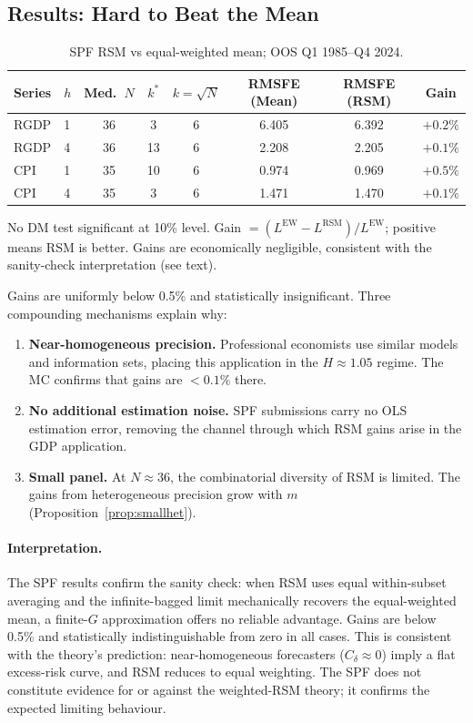 \documentclass[12pt,a4paper]{article}
\theoremstyle{definition}
\begin{document}
\subsection{Results: Hard to Beat the Mean}

\begin{table}[ht]
\centering
\caption{SPF RSM vs equal-weighted mean; OOS Q1 1985--Q4 2024.}
\label{tab:spf}
\begin{tabular}{llcccccc}
\toprule
Series & $h$ & Med.\ $N$ & $k^*$ & $k=\!\sqrt{N}$ & RMSFE (Mean) & RMSFE (RSM) & Gain \\
\midrule
RGDP & 1 & 36 & 3  & 6 & 6.405 & 6.392 & $+0.2\%$ \\
RGDP & 4 & 36 & 13 & 6 & 2.208 & 2.205 & $+0.1\%$ \\
CPI  & 1 & 35 & 10 & 6 & 0.974 & 0.969 & $+0.5\%$ \\
CPI  & 4 & 35 &  3 & 6 & 1.471 & 1.470 & $+0.1\%$ \\
\bottomrule
\end{tabular}
\footnotesize{No DM test significant at 10\% level. Gain $=(L^{\mathrm{EW}}-L^{\mathrm{RSM}})/L^{\mathrm{EW}}$;
positive means RSM is better. Gains are economically negligible, consistent with the
sanity-check interpretation (see text).}
\end{table}

Gains are uniformly below 0.5\% and statistically insignificant. Three
compounding mechanisms explain why:
\begin{enumerate}
\item \textbf{Near-homogeneous precision.} Professional economists use
  similar models and information sets, placing this application in the
  $H\approx1.05$ regime. The MC confirms that gains are $<0.1\%$ there.
\item \textbf{No additional estimation noise.} SPF submissions carry no
  OLS estimation error, removing the channel through which RSM gains arise
  in the GDP application.
\item \textbf{Small panel.} At $N\approx36$, the combinatorial diversity of
  RSM is limited. The gains from heterogeneous precision grow with $m$
  (Proposition~\ref{prop:smallhet}).
\end{enumerate}

\paragraph{Interpretation.}
The SPF results confirm the sanity check: when RSM uses equal within-subset
averaging and the infinite-bagged limit mechanically recovers the
equal-weighted mean, a finite-$G$ approximation offers no reliable advantage.
Gains are below 0.5\% and statistically indistinguishable from zero in all
cases. This is consistent with the theory's prediction: near-homogeneous
forecasters ($C_\delta\approx0$) imply a flat excess-risk curve, and RSM
reduces to equal weighting. The SPF does not constitute evidence for or
against the weighted-RSM theory; it confirms the expected limiting behaviour.
\end{document}
